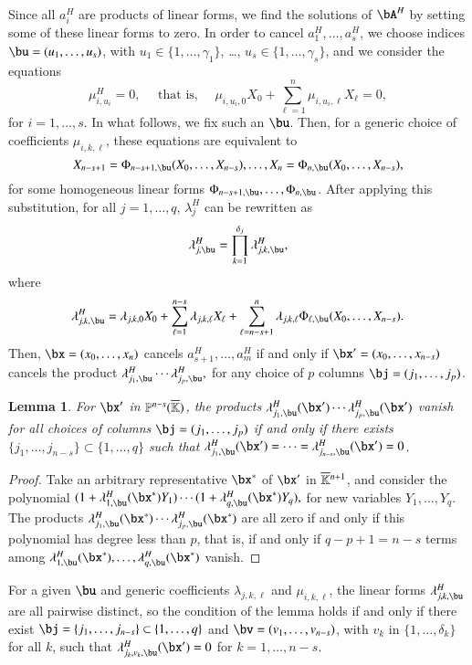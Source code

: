 \documentclass[amsthm]{elsart}
\newtheorem{lemma}[definition]{Lemma}
\begin{document}
Since all $a_i^H$ are products of linear forms, we find the solutions
of $\bA^H$ by setting some of these linear forms to zero. In order to
cancel $a_1^H,\dots,a_s^H$, we choose indices $\bu=(u_1,\dots,u_s)$,
with $u_1\in\{1,\dots,\gamma_1\}$, \dots,
$u_s\in\{1,\dots,\gamma_s\}$, and we consider the equations 
$$\mu^H_{i,u_i}=0, \quad \text{~that is,~} \quad \mu_{i,u_i,0}X_0 + \sum_{\ell = 1}^{n}\mu_{i,u_i,\ell}X_\ell =0,$$ for $i=1,\dots,s$.
In what follows, we fix such an $\bu$.
Then, for a generic choice of coefficients $\mu_{i,k,\ell}$, these equations
are equivalent to
$$X_{n-s+1}=\Phi_{n-s+1,\bu}(X_0,\dots,X_{n-s}),\dots,X_{n}=\Phi_{n,\bu}(X_0,\dots,X_{n-s}),$$
for some homogeneous linear forms
$\Phi_{n-s+1,\bu},\dots,\Phi_{n,\bu}$.  After applying this
substitution, for all $j=1,\dots,q$, $\lambda^H_j$ can be rewritten as
$$\lambda^H_{j,\bu}=\prod_{k=1}^{\delta_j}\lambda^H_{j,k,\bu},$$
where 
$$\lambda^H_{j,k,\bu}=\lambda_{j,k,0}X_0 + \sum_{\ell =
  1}^{n-s}\lambda_{j,k,\ell}X_\ell + \sum_{\ell =
  n-s+1}^{n}\lambda_{j,k,\ell}
\Phi_{\ell,\bu}(X_0,\dots,X_{n-s}).$$ Then,
$\bx=(x_0,\dots,x_n)$ cancels $a^H_{s+1},\dots,a^H_m$ if and only if
$\bx'=(x_0,\dots,x_{n-s})$ cancels the product
$\lambda^H_{j_1,\bu}\cdots \lambda^H_{j_p,\bu},$ for any choice of $p$ columns
$\bj=(j_1,\dots,j_p)$.

\begin{lemma}
  For $\bx'$ in $\mathbb{P}^{n-s}(\overline{\mathbb{K}})$, the products
  $\lambda^H_{j_1,\bu}(\bx')\cdots \lambda^H_{j_p,\bu}(\bx')$
  vanish for all choices of columns $\bj=(j_1,\dots,j_p)$ if and only
  if there exists $\{j_1,\dots,j_{n-s}\} \subset \{1,\dots,q\}$ such 
  that $\lambda^H_{j_1,\bu}(\bx')=\cdots=\lambda^H_{j_{n-s},\bu}(\bx')=0$.
\end{lemma}
\begin{proof}
  Take an arbitrary representative $\bx^*$ of $\bx'$ in
  $\overline{\mathbb{K}}{}^{n+1}$, and consider the polynomial 
  $(1+\lambda^H_{1,\bu}(\bx^*)Y_1) \cdots (1+\lambda^H_{q,\bu}(\bx^*)Y_q),$
  for new variables $Y_1,\dots,Y_q$. The products
  $\lambda^H_{j_1,\bu}(\bx^*)\cdots \lambda^H_{j_p,\bu}(\bx^*)$ are all zero
  if and only if this polynomial has degree less than $p$, that is, if
  and only if $q-p+1=n-s$ terms among
  $\lambda^H_{1,\bu}(\bx^*),\dots,\lambda^H_{q,\bu}(\bx^*)$ vanish.
\end{proof}


For a given $\bu$ and generic coefficients $\lambda_{j,k,\ell}$ and $\mu_{i,k,\ell}$,
 the linear forms $\lambda^H_{j,k,\bu}$ are all pairwise distinct, so
the condition of the lemma holds if and only if there exist
$\bj=\{j_1,\dots,j_{n-s}\} \subset \{1,\dots,q\}$ and
$\bv=(v_1,\dots,v_{n-s})$, with $v_k$ in $\{1,\dots,\delta_k\}$ for all
$k$, such that $\lambda^H_{j_k,v_k,\bu}(\bx')=0$ 
for $k=1,\dots,n-s$.
\end{document}
